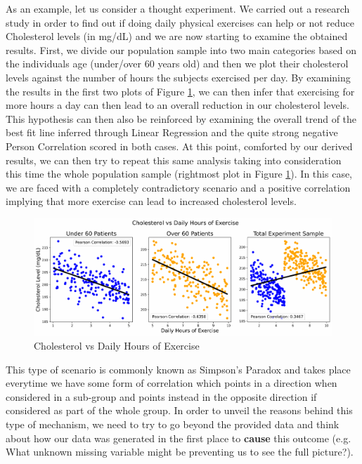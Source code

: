 As an example, let us consider a thought experiment. We carried out a research study in order to find out if doing daily physical exercises can help or not reduce Cholesterol levels (in mg/dL) and we are now starting to examine the obtained results. First, we divide our population sample into two main categories based on the individuals age (under/over 60 years old) and then we plot their cholesterol levels against the number of hours the subjects exercised per day. By examining the results in the first two plots of Figure \ref{s1}, we can then infer that exercising for more hours a day can then lead to an overall reduction in our cholesterol levels. This hypothesis can then also be reinforced by examining the overall trend of the best fit line inferred through Linear Regression and the quite strong negative Person Correlation scored in both cases. At this point, comforted by our derived results, we can then try to repeat this same analysis taking into consideration this time the whole population sample (rightmost plot in Figure \ref{s1}). In this case, we are faced with a completely contradictory scenario and a positive correlation implying that more exercise can lead to increased cholesterol levels.

\begin{figure}[ht!]%
    \centering
    \includegraphics[width=1\linewidth]{latex/images/simpson1.pdf}
    \vspace{-0.5cm}
    \caption{Cholesterol vs Daily Hours of Exercise}
    \label{s1}
\end{figure}
\vspace{-0.7cm}

This type of scenario is commonly known as Simpson's Paradox and takes place everytime we have some form of correlation which points in a direction when considered in a sub-group and points instead in the opposite direction if considered as part of the whole group. In order to unveil the reasons behind this type of mechanism, we need to try to go beyond the provided data and think about how our data was generated in the first place to \textbf{cause} this outcome (e.g. What unknown missing variable might be preventing us to see the full picture?).

